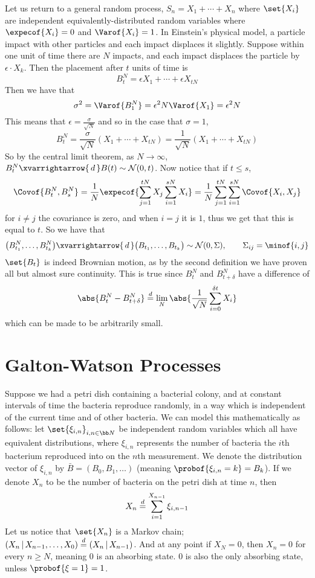 Let us return to a general random process, $S_n=X_1+\cdots+X_n$ where $\set{X_i}$ are independent equivalently-distributed random variables where $\expecof{X_i}=0$ and $\Varof{X_i}=1$.
In Einstein's physical model, a particle impact with other particles and each impact displaces it slightly.
Suppose within one unit of time there are $N$ impacts, and each impact displaces the particle by $\epsilon\cdot X_k$.
Then the placement after $t$ units of time is
$$ B_t^N = \epsilon X_1+\cdots+\epsilon X_{tN} $$
Then we have that
$$ \sigma^2 = \Varof{B_1^N} = \epsilon^2N\Varof{X_1} = \epsilon^2N $$
This means that $\epsilon=\frac\sigma{\sqrt N}$ and so in the case that $\sigma=1$,
$$ B^N_t = \frac\sigma{\sqrt N}(X_1+\cdots+X_{tN}) = \frac1{\sqrt N}(X_1+\cdots+X_{tN}) $$
So by the central limit theorem, as $N\to\infty$, $B^N_t\xvarrightarrow{\,d\,}B(t)\sim{\cal N}(0,t)$.
Now notice that if $t\leq s$,
$$ \Covof{B^N_t,B^N_s} = \frac1N\expecof{\sum_{j=1}^{tN}X_j\sum_{i=1}^{sN}X_i} = \frac1N\sum_{j=1}^{tN}\sum_{i=1}^{sN}\Covof{X_i,X_j} $$
for $i\neq j$ the covariance is zero, and when $i=j$ it is $1$, thus we get that this is equal to $t$.
So we have that
$$ \bigl(B^N_{t_1},\dots,B^N_{t_k}\bigr)\xvarrightarrow{\,d\,}\bigl(B_{t_1},\dots,B_{t_k}\bigr)\sim{\cal N}(0,\Sigma),\qquad \Sigma_{ij}=\minof{i,j} $$
$\set{B_t}$ is indeed Brownian motion, as by the second definition we have proven all but almost sure continuity.
This is true since $B_t^N$ and $B_{t+\delta}^N$ have a difference of
$$ \abs{B_t^N - B_{t+\delta}^N} \buildrel d\over= \lim_N\abs{\frac1{\sqrt N}\sum_{i=0}^{\delta t}X_i} $$
which can be made to be arbitrarily small.

\vfill\break

\section{Galton-Watson Processes}

Suppose we had a petri dish containing a bacterial colony, and at constant intervals of time the bacteria reproduce randomly, in a way which is independent of the current time and of other bacteria.
We can model this mathematically as follows: let $\set{\xi_{i,n}}_{i,n\in{\bb N}}$ be independent random variables which all have equivalent distributions, where $\xi_{i,n}$ represents the number of
bacteria the $i$th bacterium reproduced into on the $n$th measurement.
We denote the distribution vector of $\xi_{i,n}$ by $\bar B=(B_0,B_1,\dots)$ (meaning $\probof{\xi_{i,n}=k}=B_k$).
If we denote $X_n$ to be the number of bacteria on the petri dish at time $n$, then
$$ X_n \buildrel d\over= \sum_{i=1}^{X_{n-1}}\xi_{i,n-1} $$
Let us notice that $\set{X_n}$ is a Markov chain; $(X_n\,|\,X_{n-1},\dots,X_0)\buildrel d\over=(X_n\,|\,X_{n-1})$.
And at any point if $X_N=0$, then $X_n=0$ for every $n\geq N$, meaning $0$ is an absorbing state.
$0$ is also the only absorbing state, unless $\probof{\xi=1}=1$.

